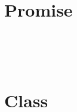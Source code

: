 \begin{lstlisting}[language=JavaScript]

\end{lstlisting}




\begin{lstlisting}[language=JavaScript]

\end{lstlisting}


\chapter{Promise}


\begin{lstlisting}[language=JavaScript]

\end{lstlisting}





\begin{lstlisting}[language=JavaScript]

\end{lstlisting}





\begin{lstlisting}[language=JavaScript]

\end{lstlisting}




\begin{lstlisting}[language=JavaScript]

\end{lstlisting}





\begin{lstlisting}[language=JavaScript]

\end{lstlisting}



\chapter{Class}


\begin{lstlisting}[language=JavaScript]

\end{lstlisting}




